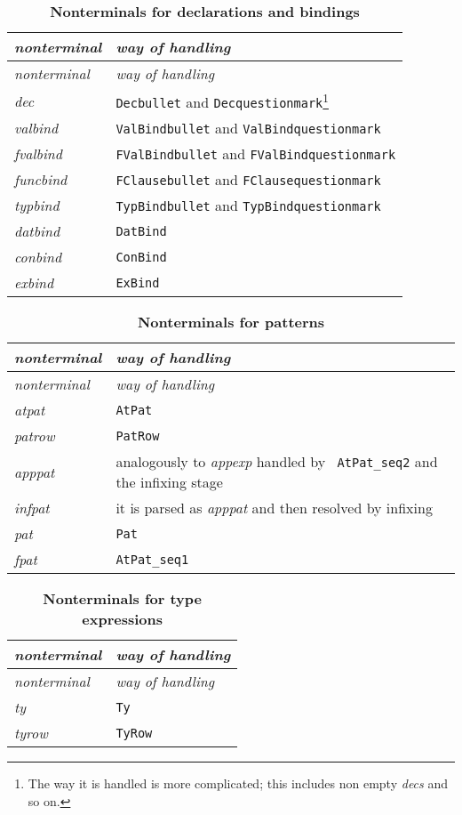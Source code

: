 \begin{longtable}{lp{80mm}}
\caption[Nonterminals for declarations and bindings]%
{\bf  Nonterminals for declarations and bindings}\\
\sl nonterminal& \sl  way of handling\\[5pt]
\endfirsthead
\sl nonterminal& \sl  way of handling\\[5pt]
\endhead
\endfoot
{\it dec} & {\tt Decbullet} and {\tt Decquestionmark}\footnote{The way
  it is handled is more complicated; this includes non empty {\it decs}
  and so on.}\\
{\it valbind} & {\tt ValBindbullet} and {\tt ValBindquestionmark}\\
{\it fvalbind} & {\tt FValBindbullet} and {\tt FValBindquestionmark}\\
{\it funcbind} & {\tt FClausebullet} and {\tt FClausequestionmark}\\
{\it typbind} & {\tt TypBindbullet} and {\tt TypBindquestionmark}\\
{\it datbind} & {\tt DatBind}\\
{\it conbind} & {\tt ConBind}\\
{\it exbind} & {\tt ExBind}\\
\end{longtable}

\begin{longtable}{lp{80mm}}
\caption[Nonterminals for patterns]%
{\bf  Nonterminals for patterns}\\
\sl nonterminal& \sl  way of handling\\[5pt]
\endfirsthead
\sl nonterminal& \sl way of handling\\[5pt]
\endhead
\endfoot
{\it atpat} & {\tt AtPat}\\
{\it patrow} & {\tt PatRow}\\
{\it apppat} & analogously to {\it appexp} handled by {\tt
  AtPat\_seq2} and the infixing stage\\
{\it infpat} & it is parsed as {\it apppat} and then resolved by
infixing\\
{\it pat} & {\tt Pat}\\
{\it fpat} & {\tt AtPat\_seq1}\\
\end{longtable}

\begin{longtable}{lp{80mm}}
\caption[Nonterminals for type expressions]%
{\bf  Nonterminals for type expressions}\\
\sl nonterminal& \sl way of handling\\[5pt]
\endfirsthead
\sl nonterminal& \sl  way of handling\\[5pt]
\endhead
\endfoot
{\it ty} & {\tt Ty}\\
{\it tyrow} & {\tt TyRow}\\
\end{longtable}

